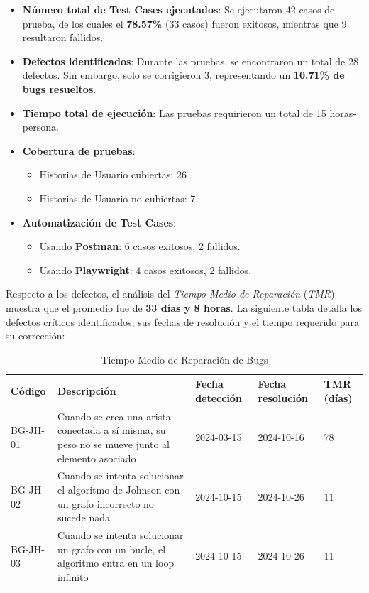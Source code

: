 \documentclass[stu, 12pt, letterpaper, donotrepeattitle, floatsintext, natbib]{apa7}
\begin{document}
\begin{itemize}
    \item \textbf{Número total de Test Cases ejecutados}: Se ejecutaron 42 casos de prueba, de los cuales el \textbf{78.57\%} (33 casos) fueron exitosos, mientras que 9 resultaron fallidos.
    \item \textbf{Defectos identificados}: Durante las pruebas, se encontraron un total de 28 defectos. Sin embargo, solo se corrigieron 3, representando un \textbf{10.71\% de bugs resueltos}.
    \item \textbf{Tiempo total de ejecución}: Las pruebas requirieron un total de 15 horas-persona.
    \item \textbf{Cobertura de pruebas}: 
    \begin{itemize}
        \item Historias de Usuario cubiertas: 26  
        \item Historias de Usuario no cubiertas: 7
    \end{itemize}
    \item \textbf{Automatización de Test Cases}: 
    \begin{itemize}
        \item Usando \textbf{Postman}: 6 casos exitosos, 2 fallidos.
        \item Usando \textbf{Playwright}: 4 casos exitosos, 2 fallidos.
    \end{itemize}
\end{itemize}

\noindent Respecto a los defectos, el análisis del \textit{Tiempo Medio de Reparación} (\textit{TMR}) muestra que el promedio fue de \textbf{33 días y 8 horas}. La siguiente tabla detalla los defectos críticos identificados, sus fechas de resolución y el tiempo requerido para su corrección:  


\begin{table}[H]
    \caption{Tiempo Medio de Reparación de Bugs}
    \centering
    \begin{tabularx}{\textwidth}{|l|X|l|l|l|}
        \hline
        \textbf{Código} & \textbf{Descripción} & \textbf{Fecha detección} & \textbf{Fecha resolución} & \textbf{TMR (días)} \\ \hline
        BG-JH-01 & Cuando se crea una arista conectada a sí misma, su peso no se mueve junto al elemento asociado & 2024-03-15 & 2024-10-16 & 78 \\ \hline
        BG-JH-02 & Cuando se intenta solucionar el algoritmo de Johnson con un grafo incorrecto no sucede nada & 2024-10-15 & 2024-10-26 & 11 \\ \hline
        BG-JH-03 & Cuando se intenta solucionar un grafo con un bucle, el algoritmo entra en un loop infinito & 2024-10-15 & 2024-10-26 & 11 \\ \hline
    \end{tabularx}
\end{table}
\end{document}
